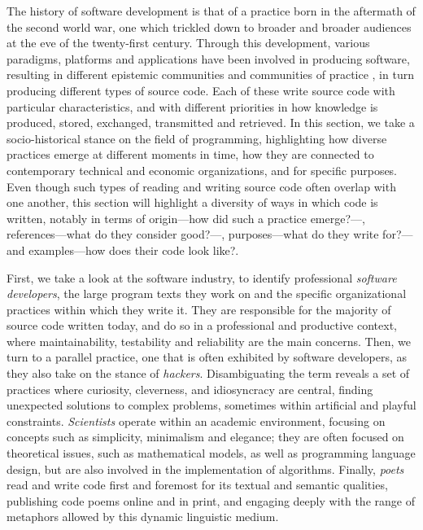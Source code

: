 The history of software development is that of a practice born in the aftermath of the second world war, one which trickled down to broader and broader audiences at the eve of the twenty-first century. Through this development, various paradigms, platforms and applications have been involved in producing software, resulting in different epistemic communities \citep{cohendet_organisational_2001} and communities of practice \citep{hayes_cultures_2017}, in turn producing different types of source code. Each of these write source code with particular characteristics, and with different priorities in how knowledge is produced, stored, exchanged, transmitted and retrieved. In this section, we take a socio-historical stance on the field of programming, highlighting how diverse practices emerge at different moments in time, how they are connected to contemporary technical and economic organizations, and for specific purposes. Even though such types of reading and writing source code often overlap with one another, this section will highlight a diversity of  ways in which code is written, notably in terms of origin—how did such a practice emerge?—, references—what do they consider good?—, purposes—what do they write for?—and examples—how does their code look like?.

First, we take a look at the software industry, to identify professional \emph{software developers}, the large program texts they work on and the specific organizational practices within which they write it. They are responsible for the majority of source code written today, and do so in a professional and productive context, where maintainability, testability and reliability are the main concerns. Then, we turn to a parallel practice, one that is often exhibited by software developers, as they also take on the stance of \emph{hackers}. Disambiguating the term reveals a set of practices where curiosity, cleverness, and idiosyncracy are central, finding unexpected solutions to complex problems, sometimes within artificial and playful constraints. \emph{Scientists} operate within an academic environment, focusing on concepts such as simplicity, minimalism and elegance; they are often focused on theoretical issues, such as mathematical models, as well as programming language design, but are also involved in the implementation of algorithms. Finally, \emph{poets} read and write code first and foremost for its textual and semantic qualities, publishing code poems online and in print, and engaging deeply with the range of metaphors allowed by this dynamic linguistic medium.

